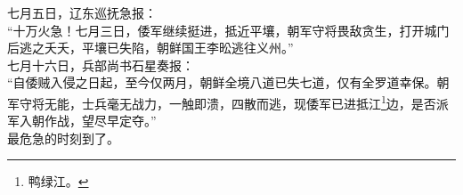 \begin{multicols}{\theparacolNo}
七月五日，辽东巡抚急报：\\

“十万火急！七月三日，倭军继续挺进，抵近平壤，朝军守将畏敌贪生，打开城门后逃之夭夭，平壤已失陷，朝鲜国王李昖逃往义州。”\\

七月十六日，兵部尚书石星奏报：\\

“自倭贼入侵之日起，至今仅两月，朝鲜全境八道已失七道，仅有全罗道幸保。朝军守将无能，士兵毫无战力，一触即溃，四散而逃，现倭军已进抵江\footnote{鸭绿江。}边，是否派军入朝作战，望尽早定夺。”\\

最危急的时刻到了。\\

\ifnum{}
	\end{multicols}
\fi
\newpage

